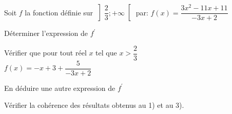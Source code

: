 \documentclass[12pt,a4paper]{article}  %
\begin{document}
Soit $f$ la fonction définie sur $\left] \dfrac{2}{3} ;+\infty\right[$ par: $f(x)=\dfrac{3 x^{2}-11 x+11}{-3 x+2}$
\begin{enumMet}
	\item Déterminer l'expression de $f^{\prime}$
	\item Vérifier que pour tout réel $x$ tel que $x>\dfrac{2}{3}$\\ $f(x)=-x+3+\dfrac{5}{-3 x+2}$
	\item En déduire une autre expression de $f^{\prime}$
	\item Vérifier la cohérence des résultats obtenus au 1) et au 3).
\end{enumMet}
\end{document}
